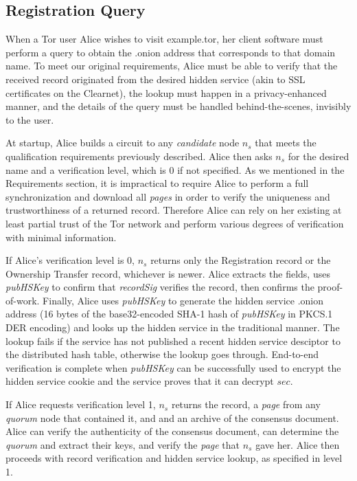 \subsection{Registration Query}


When a Tor user Alice wishes to visit example.tor, her client software must perform a query to obtain the .onion address that corresponds to that domain name. To meet our original requirements, Alice must be able to verify that the received record originated from the desired hidden service (akin to SSL certificates on the Clearnet), the lookup must happen in a privacy-enhanced manner, and the details of the query must be handled behind-the-scenes, invisibly to the user.

At startup, Alice builds a circuit to any \emph{candidate} node $ n_{s} $ that meets the qualification requirements previously described. Alice then asks $ n_{s} $ for the desired name and a verification level, which is 0 if not specified. As we mentioned in the Requirements section, it is impractical to require Alice to perform a full synchronization and download all \emph{pages} in order to verify the uniqueness and trustworthiness of a returned record. Therefore Alice can rely on her existing at least partial trust of the Tor network and perform various degrees of verification with minimal information.

If Alice's verification level is 0, $ n_{s} $ returns only the Registration record or the Ownership Transfer record, whichever is newer. Alice extracts the fields, uses \emph{pubHSKey} to confirm that \emph{recordSig} verifies the record, then confirms the proof-of-work. Finally, Alice uses \emph{pubHSKey} to generate the hidden service .onion address (16 bytes of the base32-encoded SHA-1 hash of \emph{pubHSKey} in PKCS.1 DER encoding) and looks up the hidden service in the traditional manner. The lookup fails if the service has not published a recent hidden service desciptor to the distributed hash table, otherwise the lookup goes through. End-to-end verification is complete when \emph{pubHSKey} can be successfully used to encrypt the hidden service cookie and the service proves that it can decrypt $ sec $.

If Alice requests verification level 1, $ n_{s} $ returns the record, a \emph{page} from any \emph{quorum} node that contained it, and and an archive of the consensus document. Alice can verify the authenticity of the consensus document, can determine the \emph{quorum} and extract their keys, and verify the \emph{page} that $ n_{s} $ gave her. Alice then proceeds with record verification and hidden service lookup, as specified in level 1.

